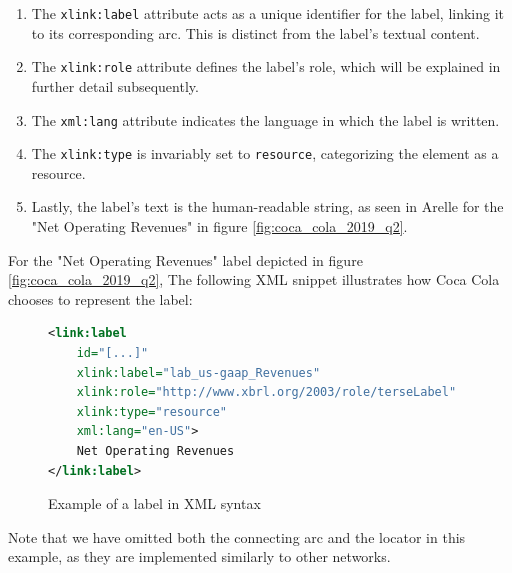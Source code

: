 

\begin{enumerate}
    \item The \texttt{xlink:label} attribute acts as a unique identifier for the label, linking it to its corresponding arc.  
    This is distinct from the label's textual content.  
    \item The \texttt{xlink:role} attribute defines the label's role, which will be explained in further detail subsequently.  
    \item The \texttt{xml:lang} attribute indicates the language in which the label is written.  
    \item The \texttt{xlink:type} is invariably set to \texttt{resource}, categorizing the element as a resource.  
    \item Lastly, the label's text is the human-readable string, as seen in Arelle for the "Net Operating Revenues" in figure \ref{fig:coca_cola_2019_q2}.  
\end{enumerate}

For the "Net Operating Revenues" label depicted in figure \ref{fig:coca_cola_2019_q2}, 
The following XML snippet illustrates how Coca Cola\cite{ko2019q2} chooses to represent the label:

\begin{figure}[H]
    \begin{lstlisting}[language=XML, basicstyle=\ttfamily\small]
<link:label 
    id="[...]" 
    xlink:label="lab_us-gaap_Revenues" 
    xlink:role="http://www.xbrl.org/2003/role/terseLabel" 
    xlink:type="resource" 
    xml:lang="en-US">
    Net Operating Revenues
</link:label>
\end{lstlisting}
    \caption{Example of a label in XML syntax}
    \label{fig:example_label_xml}
\end{figure}

Note that we have omitted both the connecting arc and the locator in this example, 
as they are implemented similarly to other networks.

